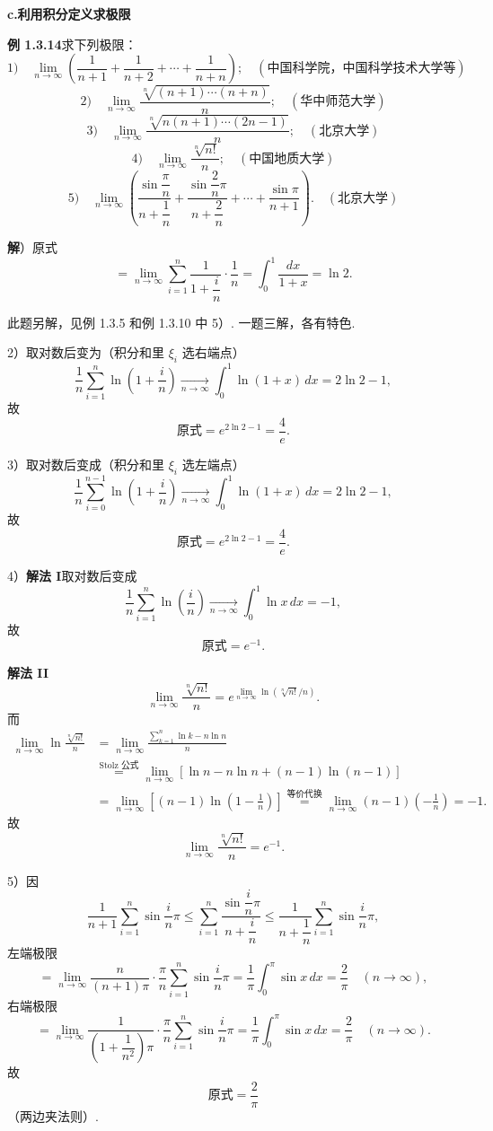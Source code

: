 \documentclass[UTF8,12pt,a4paper,fontset=fandol]{ctexart}
\begin{document}
\noindent\textbf{c.\quad 利用积分定义求极限}

\noindent\textbf{例 1.3.14}\quad 求下列极限：
\[
1)\quad
\lim_{n\to\infty}
\left(\frac1{n+1}+\frac1{n+2}+\cdots+\frac1{n+n}\right);
\quad(\text{中国科学院，中国科学技术大学等})
\]
\[
2)\quad
\lim_{n\to\infty}\frac{\sqrt[n]{(n+1)\cdots(n+n)}}n;
\quad(\text{华中师范大学})
\]
\[
3)\quad
\lim_{n\to\infty}\frac{\sqrt[n]{n(n+1)\cdots(2n-1)}}n;
\quad(\text{北京大学})
\]
\[
4)\quad
\lim_{n\to\infty}\frac{\sqrt[n]{n!}}n;
\quad(\text{中国地质大学})
\]
\[
5)\quad
\lim_{n\to\infty}
\left(
\frac{\sin\dfrac{\pi}{n}}{n+\dfrac1n}
+\frac{\sin\dfrac2n\pi}{n+\dfrac2n}
+\cdots+
\frac{\sin\pi}{n+1}
\right).
\quad(\text{北京大学})
\]

\noindent\textbf{解}）原式
\[
  =\lim_{n\to\infty}\sum_{i=1}^n
  \frac1{1+\dfrac in}\cdot\frac1n
  =\int_0^1\frac{dx}{1+x}=\ln2.
\]

此题另解，见例 1.3.5 和例 1.3.10 中 5）. 一题三解，各有特色.

2）取对数后变为（积分和里 $\xi_i$ 选右端点）
\[
  \frac1n\sum_{i=1}^n\ln\left(1+\frac in\right)
  \xrightarrow[n\to\infty]{}
  \int_0^1\ln(1+x)\,dx=2\ln2-1,
\]
故
\[
  \text{原式}=e^{2\ln2-1}=\frac4e.
\]

3）取对数后变成（积分和里 $\xi_i$ 选左端点）
\[
  \frac1n\sum_{i=0}^{n-1}\ln\left(1+\frac in\right)
  \xrightarrow[n\to\infty]{}
  \int_0^1\ln(1+x)\,dx=2\ln2-1,
\]
故
\[
  \text{原式}=e^{2\ln2-1}=\frac4e.
\]

4）\textbf{解法 I}\quad 取对数后变成
\[
  \frac1n\sum_{i=1}^n\ln\left(\frac in\right)
  \xrightarrow[n\to\infty]{}
  \int_0^1\ln x\,dx=-1,
\]
故
\[
  \text{原式}=e^{-1}.
\]

\noindent\textbf{解法 II}\quad
\[
  \lim_{n\to\infty}\frac{\sqrt[n]{n!}}n
  =e^{\lim\limits_{n\to\infty}\ln(\sqrt[n]{n!}/n)}.
\]
而
\[
\begin{aligned}
\lim_{n\to\infty}\ln\frac{\sqrt[n]{n!}}n
&=\lim_{n\to\infty}\frac{\sum_{k=1}^n\ln k-n\ln n}{n}\\
&\stackrel{\text{Stolz 公式}}{=}
\lim_{n\to\infty}
\left[\ln n-n\ln n+(n-1)\ln(n-1)\right]\\
&=\lim_{n\to\infty}
\left[(n-1)\ln\left(1-\frac1n\right)\right]
\stackrel{\text{等价代换}}{=}
\lim_{n\to\infty}(n-1)\left(-\frac1n\right)=-1.
\end{aligned}
\]
故
\[
  \lim_{n\to\infty}\frac{\sqrt[n]{n!}}n=e^{-1}.
\]

5）因
\[
  \frac1{n+1}\sum_{i=1}^n\sin\frac in\pi
  \le
  \sum_{i=1}^n\frac{\sin\dfrac in\pi}{n+\dfrac in}
  \le
  \frac1{n+\dfrac1n}\sum_{i=1}^n\sin\frac in\pi,
\]
左端极限
\[
  =\lim_{n\to\infty}\frac{n}{(n+1)\pi}\cdot
  \frac\pi n\sum_{i=1}^n\sin\frac in\pi
  =\frac1\pi\int_0^\pi\sin x\,dx
  =\frac2\pi\quad(n\to\infty),
\]
右端极限
\[
  =\lim_{n\to\infty}
  \frac1{\left(1+\dfrac1{n^2}\right)\pi}\cdot
  \frac\pi n\sum_{i=1}^n\sin\frac in\pi
  =\frac1\pi\int_0^\pi\sin x\,dx
  =\frac2\pi\quad(n\to\infty).
\]
故
\[
  \text{原式}=\frac2\pi
\]
（两边夹法则）.
\end{document}
